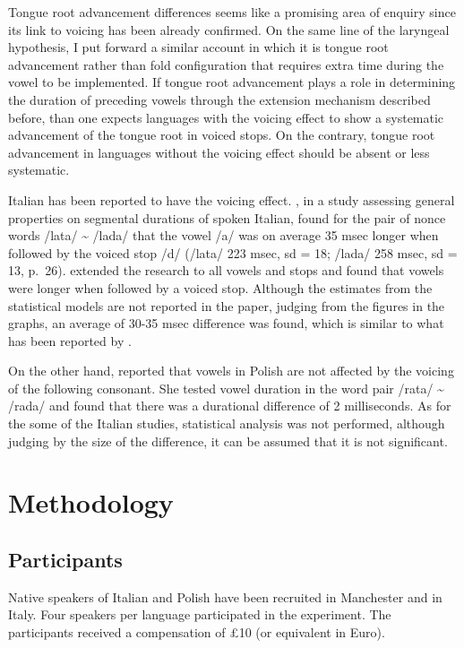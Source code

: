 \documentclass[authoryear]{elsarticle}
\begin{document}
Tongue root advancement differences seems like a promising area of
enquiry since its link to voicing has been already confirmed. On the
same line of the laryngeal hypothesis, I put forward a similar account
in which it is tongue root advancement rather than fold configuration
that requires extra time during the vowel to be implemented. If tongue
root advancement plays a role in determining the duration of preceding
vowels through the extension mechanism described before, than one
expects languages with the voicing effect to show a systematic
advancement of the tongue root in voiced stops. On the contrary, tongue
root advancement in languages without the voicing effect should be
absent or less systematic.

Italian has been reported to have the voicing effect.
\citet{farnetani1986}, in a study assessing general properties on
segmental durations of spoken Italian, found for the pair of nonce words
/lata/ \textasciitilde{} /lada/ that the vowel /a/ was on average 35
msec longer when followed by the voiced stop /d/ (/lata/ 223 msec, sd =
18; /lada/ 258 msec, sd = 13, p.~26). \citet{esposito2002} extended the
research to all vowels and stops and found that vowels were longer when
followed by a voiced stop. Although the estimates from the statistical
models are not reported in the paper, judging from the figures in the
graphs, an average of 30-35 msec difference was found, which is similar
to what has been reported by \citet{farnetani1986}.

On the other hand, \citet{keating1984} reported that vowels in Polish
are not affected by the voicing of the following consonant. She tested
vowel duration in the word pair /rata/ \textasciitilde{} /rada/ and
found that there was a durational difference of 2 milliseconds. As for
the some of the Italian studies, statistical analysis was not performed,
although judging by the size of the difference, it can be assumed that
it is not significant.

\section{Methodology}\label{methodology}

\subsection{Participants}\label{participants}

Native speakers of Italian and Polish have been recruited in Manchester
and in Italy. Four speakers per language participated in the experiment.
The participants received a compensation of £10 (or equivalent in Euro).
\end{document}
